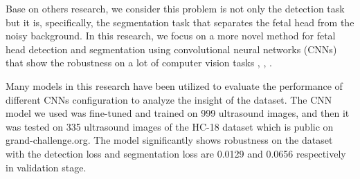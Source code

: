 	Base on others research, we consider this problem is not only the detection task but it is, specifically, the segmentation task that separates the fetal head from the noisy background. In this research, we focus on a more novel method for fetal head detection and segmentation using convolutional neural networks (CNNs) that show the robustness on a lot of computer vision tasks \cite{yamashita}, \cite{guidetocnn}, \cite{dlvstradition}. 
	
	Many models in this research have been utilized to evaluate the performance of different CNNs configuration to analyze the insight of the dataset. The CNN model we used was fine-tuned and trained on 999 ultrasound images, and then it was tested on 335 ultrasound images of the HC-18 dataset which is public on grand-challenge.org. The model significantly shows robustness on the dataset with the detection loss and segmentation loss are 0.0129 and 0.0656 respectively in validation stage.

	
 
	
	

